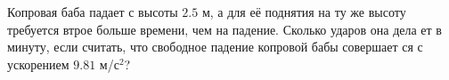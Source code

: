 Копровая баба падает с высоты $2.5$ м, а для её поднятия на ту же высоту
требуется втрое больше времени, чем на падение. Сколько ударов она дела
ет в минуту, если считать, что свободное падение копровой бабы совершает
ся с ускорением $9.81$ м/с$^2$?
